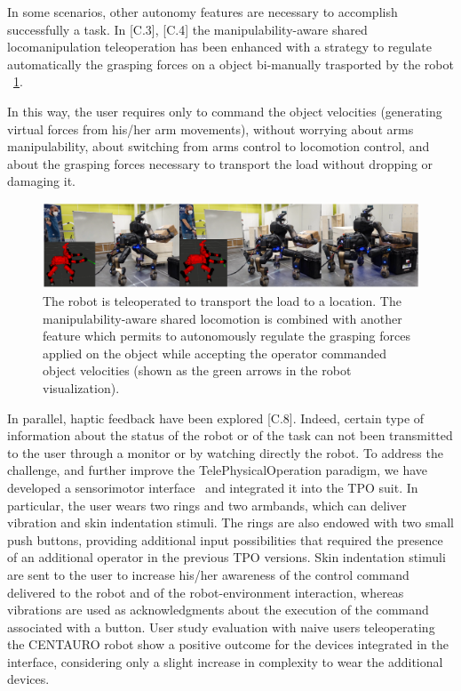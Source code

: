 In some scenarios, other autonomy features are necessary to accomplish successfully a task. In [C.3], [C.4] the manipulability-aware shared locomanipulation teleoperation has been enhanced with a strategy to regulate automatically the grasping forces on a object bi-manually trasported by the robot \figurename~\ref{fig:tpoexpbox}.

In this way, the user requires only to command the object velocities (generating virtual forces from his/her arm movements), without worrying about arms manipulability, about switching from arms control to locomotion control, and about the grasping forces necessary to transport the load without dropping or damaging it.

\begin{figure}[H]
	\centering
	\includegraphics[width=0.9\linewidth]{img/tpoexpbox}
	\caption{The robot is teleoperated to transport the load to a location. The manipulability-aware shared locomotion is combined with another feature which permits to autonomously regulate the grasping forces applied on the object while accepting the operator commanded object velocities (shown as the green arrows in the robot visualization).}
	\label{fig:tpoexpbox}
\end{figure}

In parallel, haptic feedback have been explored [C.8]. Indeed, certain type of information about the status of the robot or of the task can not been transmitted to the user through a monitor or by watching directly the robot. To address the challenge, and further improve the TelePhysicalOperation paradigm, we have developed a sensorimotor interface~\cite{prattichizzo2021human} and integrated it into the TPO suit. In particular, the user wears two rings and two armbands, which can deliver vibration and skin indentation
stimuli. The rings are also endowed with two small push buttons, providing additional input possibilities that required the presence of an additional operator in the previous TPO versions. Skin indentation stimuli are sent to the user to increase his/her awareness of the control command delivered to the robot and of the robot-environment interaction, whereas vibrations are used as acknowledgments about the execution of the command associated with a button.
User study evaluation with naive users teleoperating the CENTAURO robot show a positive outcome for the devices integrated in the interface, considering only a slight increase in complexity to wear the additional devices.


